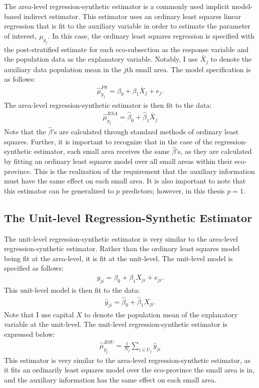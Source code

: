 \documentclass[12pt,twoside]{reedthesis}
\begin{document}
The area-level regression-synthetic estimator is a commonly used implicit model-based indirect estimator. This estimator uses an ordinary least squares linear regression that is fit to the auxiliary variable in order to estimate the parameter of interest, \(\mu_{y_j}\). In this case, the ordinary least squares regression is specified with the post-stratified estimate for each eco-subsection as the response variable and the population data as the explanatory variable. Notably, I use \(\bar X_j\) to denote the auxiliary data population mean in the \(j\)th small area. The model specification is as follows:
\begin{align}
\hat\mu_{y_j}^{PS} = \beta_0 + \beta_1 \bar X_{j} + e_j.
\end{align}
The area-level regression-synthetic estimator is then fit to the data:
\begin{align}
\hat\mu_{y_j}^{RSA} = \hat\beta_0 + \hat\beta_1 \bar X_{j}
\end{align}
Note that the \(\hat \beta\)'s are calculated through standard methods of ordinary least squares. Further, it is important to recognize that in the case of the regression-synthetic estimator, each small area receives the same \(\hat\beta\)'s, as they are calculated by fitting an ordinary least squares model over all small areas within their eco-province. This is the realization of the requirement that the auxiliary information must have the same effect on each small area. It is also important to note that this estimator can be generalized to \(p\) predictors; however, in this thesis \(p=1\).

\hypertarget{the-unit-level-regression-synthetic-estimator}{%
\subsection{The Unit-level Regression-Synthetic Estimator}\label{the-unit-level-regression-synthetic-estimator}}

The unit-level regression-synthetic estimator is very similar to the area-level regression-synthetic estimator. Rather than the ordinary least squares model being fit at the area-level, it is fit at the unit-level. The unit-level model is specified as follows:
\begin{align}
y_{ji} = \beta_0 + \beta_1 X_{ji} + e_{ji}.
\end{align}
This unit-level model is then fit to the data:
\begin{align}
\hat y_{ji} = \hat\beta_0 + \hat\beta_1 X_{ji}.
\end{align}
Note that I use capital \(X\) to denote the population mean of the explanatory variable at the unit-level. The unit-level regression-synthetic estimator is expressed below:
\begin{align}
\hat\mu_{y_j}^{RSU} = \frac{1}{N_j} \sum_{i \in U_j} \hat y_{ji}
\end{align}
This estimator is very similar to the area-level regression-synthetic estimator, as it fits an ordinarily least squares model over the eco-province the small area is in, and the auxiliary information has the same effect on each small area.
\end{document}
